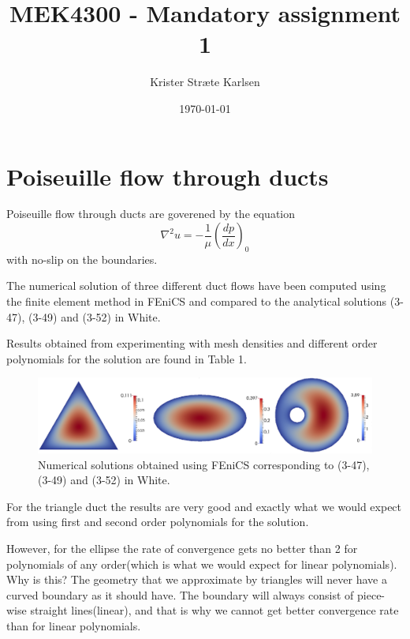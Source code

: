 \documentclass[11pt,a4paper,english]{article}
\title{MEK4300 - Mandatory assignment 1}
\author{Krister Stræte Karlsen}
\date{\today}
\numberwithin{equation}{section}
\begin{document}
\maketitle

\section{Poiseuille flow through ducts}

Poiseuille flow through ducts are goverened by the equation 
\begin{equation}
\nabla^2 u = -\frac{1}{\mu}\left( \frac{dp}{dx} \right)_0  
\end{equation}
with no-slip on the boundaries.  

The numerical solution of three different duct flows have been computed using the finite element method in FEniCS and compared to the analytical solutions (3-47), (3-49) and (3-52) in White.  

Results obtained from experimenting with mesh densities and different order polynomials for the solution are found in Table 1.

\begin{figure}[h!] 
\begin{center}
  \includegraphics[scale=0.2]{ducts.png}
  \end{center}
  \caption{Numerical solutions obtained using FEniCS corresponding to (3-47), (3-49) and (3-52) in White.}
\end{figure}

For the triangle duct the results are very good and exactly what we would expect from using first and second order polynomials for the solution. 

However, for the ellipse the rate of convergence gets no better than 2 for polynomials of any order(which is what we would expect for linear polynomials). Why is this? The geometry that we approximate by triangles will never have a curved boundary as it should have. The boundary will always consist of piece-wise straight lines(linear), and that is why we cannot get better convergence rate than for linear polynomials.    
\end{document}
